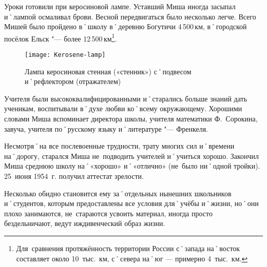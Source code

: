 Уроки готовили при керосиновой лампе. Уставший Миша иногда засыпал и˚лампой осмаливал брови. Весной передвигаться было несколько легче. Всего Мишей было пройдено в˚школу в˚деревню Богутичи 4\,500\,км, в˚городской посёлок Ельск "--- более 12\,500\,км\footnote{Для~сравнения протяжённость территории России с˚запада на˚восток составляет около 10~тыс.~км, с˚севера на˚юг — примерно 4~тыс.~км.}. 

\begin{wrapfigure}{O}{.25\textwidth}
\centering
\texttt{[image: Kerosene-lamp]}
\caption[Лампа керосиновая стенная («стенник») с˚подвесом и˚рефлектором (отражателем)]{Лампа керосиновая стенная («стенник») с˚подвесом и˚рефлектором (отражателем)\footnotemark}
\label{fig:Kerosene-lamp}
\end{wrapfigure}

Учителя были высококвалифицированными и˚старались больше знаний дать ученикам, воспитывали в˚духе любви ко˚всему окружающему. Хорошими словами Миша вспоминает директора школы, учителя математики Ф.~Сорокина, завуча, учителя по˚русскому языку и˚литературе "--- Френкеля. 

Несмотря˚на все послевоенные трудности, трату многих сил и˚времени на˚дорогу, старался Миша не~подводить учителей и˚учиться хорошо. Закончил Миша среднюю школу на˚«хорошо» и˚«отлично» (не~было ни˚одной тройки). 25~июня 1954~г. получил аттестат зрелости.

Несколько обидно становится ему за˚отдельных нынешних школьников и˚студентов, которым предоставлены все условия для˚учёбы и˚жизни, но˚они плохо занимаются, не~стараются усвоить материал, иногда просто бездельничают, ведут иждивенческий образ жизни.

